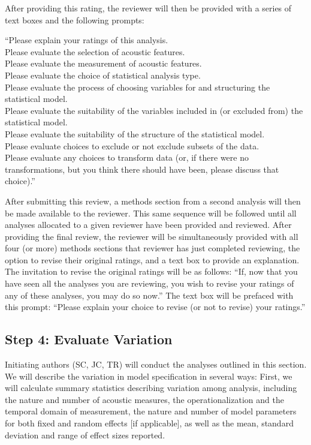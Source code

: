 \documentclass[
  english,
  man]{apa6}
\begin{document}
After providing this rating, the reviewer will then be provided with a series of text boxes and the following prompts:

\noindent \enquote{Please explain your ratings of this analysis.\\
\noindent Please evaluate the selection of acoustic features.\\
\noindent Please evaluate the measurement of acoustic features.\\
\noindent Please evaluate the choice of statistical analysis type.\\
\noindent Please evaluate the process of choosing variables for and structuring the statistical model.\\
\noindent Please evaluate the suitability of the variables included in (or excluded from) the statistical model.\\
\noindent Please evaluate the suitability of the structure of the statistical model.\\
\noindent Please evaluate choices to exclude or not exclude subsets of the data.\\
\noindent Please evaluate any choices to transform data (or, if there were no transformations, but you think there should have been, please discuss that choice).}

After submitting this review, a methods section from a second analysis will then be made available to the reviewer.
This same sequence will be followed until all analyses allocated to a given reviewer have been provided and reviewed.
After providing the final review, the reviewer will be simultaneously provided with all four (or more) methods sections that reviewer has just completed reviewing, the option to revise their original ratings, and a text box to provide an explanation.
The invitation to revise the original ratings will be as follows: \enquote{If, now that you have seen all the analyses you are reviewing, you wish to revise your ratings of any of these analyses, you may do so now.}
The text box will be prefaced with this prompt: \enquote{Please explain your choice to revise (or not to revise) your ratings.}

\hypertarget{step-4-evaluate-variation}{%
\subsection{Step 4: Evaluate Variation}\label{step-4-evaluate-variation}}

Initiating authors (SC, JC, TR) will conduct the analyses outlined in this section.
We will describe the variation in model specification in several ways:
First, we will calculate summary statistics describing variation among analysis, including the nature and number of acoustic measures, the operationalization and the temporal domain of measurement, the nature and number of model parameters for both fixed and random effects {[}if applicable{]}, as well as the mean, standard deviation and range of effect sizes reported.
\end{document}

